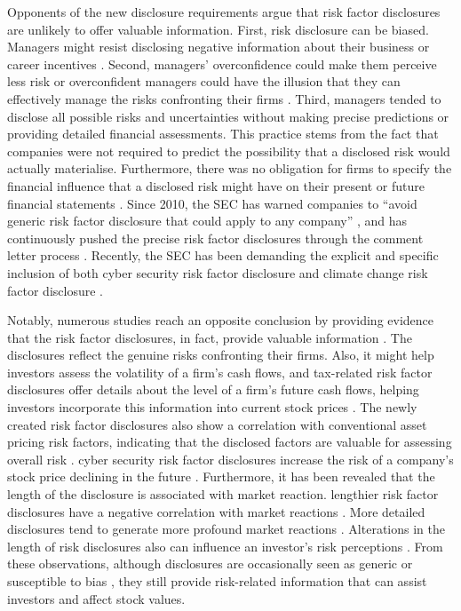 \documentclass[logo,bsc,singlespacing,parskip]{infthesis}
\begin{document}
Opponents of the new disclosure requirements argue that risk factor disclosures are unlikely to offer valuable information. First, risk disclosure can be biased. Managers might resist disclosing negative information about their business or career incentives 
\cite{wattszimmerman1986, scott1994, fieldsetal2001, kotharietal2009a, kotharietal2009b}. Second, managers’ overconfidence could make them perceive less risk or overconfident managers could have the illusion that they can effectively manage the risks confronting their firms \cite{chang2019}. Third, managers tended to disclose all possible risks and uncertainties without making precise predictions or providing detailed financial assessments. This practice stems from the fact that companies were not required to predict the possibility that a disclosed risk would actually materialise. Furthermore, there was no obligation for firms to specify the financial influence that a disclosed risk might have on their present or future financial statements \cite{reuters2005}. Since 2010, the SEC has warned companies to “avoid generic risk factor disclosure that could apply to any company” \cite{sec2010}, and has continuously pushed the precise risk factor disclosures through the comment letter process \cite{cfo2010}. Recently, the SEC has been demanding the explicit and specific inclusion of both cyber security risk factor disclosure and climate change risk factor disclosure \citep{kingsleyetal2021, peirce2023}. 

Notably, numerous studies reach an opposite conclusion by providing evidence that the risk factor disclosures, in fact, provide valuable information \cite{campbelletal2014a, israelsen2014, songetal2020, hopeetal2016, kravetmuslu2013, reuters2005, chang2019}. The disclosures reflect the genuine risks confronting their firms. Also, it might help investors assess the volatility of a firm's cash flows, and tax-related risk factor disclosures offer details about the level of a firm's future cash flows, helping investors incorporate this information into current stock prices \cite{campbelletal2014a}. The newly created risk factor disclosures also show a correlation with conventional asset pricing risk factors, indicating that the disclosed factors are valuable for assessing overall risk \cite{israelsen2014}. 
cyber security risk factor disclosures increase the risk of a company’s stock price declining in the future \cite{songetal2020}.
Furthermore, it has been revealed that the length of the disclosure is associated with market reaction. lengthier risk factor disclosures have a negative correlation with market reactions \cite{campbelletal2014a}. More detailed disclosures tend to generate more profound market reactions \cite{hopeetal2016}. Alterations in the length of risk disclosures also can influence an investor's risk perceptions \cite{kravetmuslu2013}. 
From these observations, although disclosures are occasionally seen as generic \cite{reuters2005} or susceptible to bias \cite{chang2019}, they still provide risk-related information that can assist investors and affect stock values.
\end{document}
